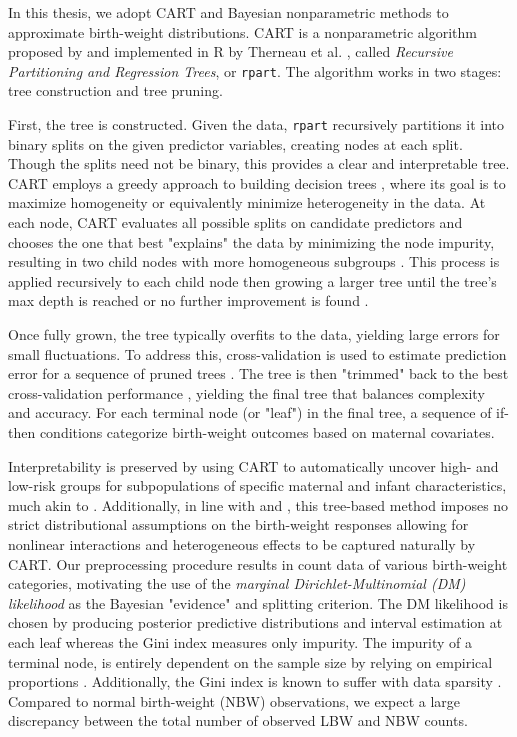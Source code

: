 In this thesis, we adopt CART and Bayesian nonparametric methods to approximate birth-weight distributions. CART is a nonparametric algorithm proposed by \citet{breiman1984classification} and implemented in R by Therneau et al. \citep{intro_to_rpart}, called \textit{Recursive Partitioning and Regression Trees}, or \texttt{rpart}. The algorithm works in two stages: tree construction and tree pruning. 
 
First, the tree is constructed. Given the data, \texttt{rpart} recursively partitions it into binary splits on the given predictor variables, creating nodes at each split. Though the splits need not be binary, this provides a clear and interpretable tree. CART employs a greedy approach to building decision trees \citep{cart_greedy}, where its goal is to maximize homogeneity or equivalently minimize heterogeneity in the data. At each node, CART evaluates all possible splits on candidate predictors and chooses the one that best "explains" the data by minimizing the node impurity, resulting in two child nodes with more homogeneous subgroups \citep{intro_to_rpart}. This process is applied recursively to each child node then growing a larger tree until the tree's max depth is reached or no further improvement is found \citep{intro_to_rpart}.

Once fully grown, the tree typically overfits to the data, yielding large errors for small fluctuations. To address this, cross-validation is used to estimate prediction error for a sequence of pruned trees \citep{intro_to_rpart}. The tree is then "trimmed" back to the best cross-validation performance \citep{intro_to_rpart}, yielding the final tree that balances complexity and accuracy. For each terminal node (or "leaf") in the final tree, a sequence of if-then conditions categorize birth-weight outcomes based on maternal covariates.

Interpretability is preserved by using CART to automatically uncover high- and low-risk groups for subpopulations of specific maternal and infant characteristics, much akin to \citet{KITSANTAS2006275}. Additionally, in line with \citet{dunson2008} and \citet{jain2024}, this tree-based method imposes no strict distributional assumptions on the birth-weight responses allowing for nonlinear interactions and heterogeneous effects to be captured naturally by CART. Our preprocessing procedure results in count data of various birth-weight categories, motivating the use of the \emph{marginal Dirichlet-Multinomial (DM) likelihood} as the Bayesian "evidence" and splitting criterion. The DM likelihood is chosen by producing posterior predictive distributions and interval estimation at each leaf whereas the Gini index measures only impurity. The impurity of a terminal node, is entirely dependent on the sample size by relying on empirical proportions \citep{stackexchangeGiniDecrease}. Additionally, the Gini index is known to suffer with data sparsity \citep{ekamperiDecisionTrees}. Compared to normal birth-weight (NBW) observations, we expect a large discrepancy between the total number of observed LBW and NBW counts.

